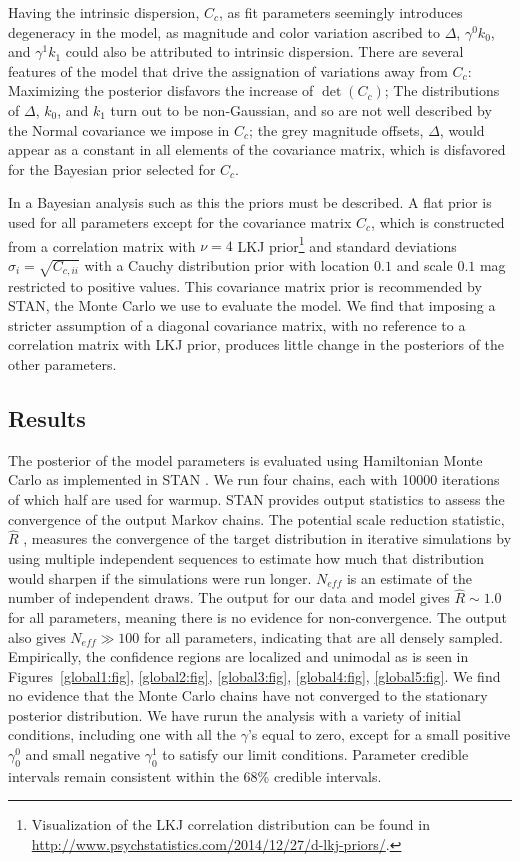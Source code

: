 \documentclass{aastex61}   	%
\begin{document}
Having the intrinsic dispersion, $C_c$, as fit parameters seemingly introduces degeneracy in the model, as magnitude and color variation
ascribed to $\Delta$, $\gamma^0 k_0$, and $\gamma^1 k_1$ could also be attributed to intrinsic dispersion.  There are several features of the model
that drive the assignation of variations away from $C_c$:  Maximizing the posterior disfavors the increase of $\det{(C_c)}$;
The distributions of $\Delta$, $k_0$, and $k_1$ turn out to
be non-Gaussian, and so are not well described by the Normal covariance we impose in $C_c$; the grey magnitude offsets, $\Delta$, would appear as a constant
in all elements of the covariance matrix, which is disfavored for the Bayesian prior selected for $C_c$.

In a Bayesian analysis such as this the priors must be described.  A flat prior is used for all parameters except
for the covariance matrix $C_c$, which is constructed from a correlation matrix with  $\nu=4$  LKJ prior\footnote{
Visualization of the LKJ correlation distribution can be found in \url{http://www.psychstatistics.com/2014/12/27/d-lkj-priors/}.}
\citep{Lewandowski20091989} and standard
deviations $\sigma_i = \sqrt{C_{c,ii}}$ with a  Cauchy distribution prior with location
 $0.1$ and scale $0.1$ mag restricted to positive values.
This covariance matrix prior is recommended by STAN, the Monte Carlo we use to evaluate the model.
 We find that imposing a stricter assumption of a
 diagonal covariance matrix, with no reference to a correlation matrix with LKJ prior, produces little change in the posteriors of
 the other parameters.

\subsection{Results}
\label{results:sec}
The posterior of the model parameters is evaluated using Hamiltonian Monte Carlo as implemented in
STAN \citep{stan}.  We run four chains, each with 10000 iterations of which
half are used for warmup.
STAN provides output statistics to assess
the convergence of the output Markov chains.
The 
potential scale reduction statistic, $\hat{R}$ \citep{Gelman92}, measures the convergence of the target distribution
in iterative simulations 
by using multiple independent sequences to estimate how much that distribution would sharpen if the simulations were run longer.
$N_{eff}$ is an estimate of the number of independent draws. The output for our data and model gives $\hat{R} \sim 1.0$ for all parameters, meaning there is no evidence for non-convergence.  The
output also gives  $N_{eff} \gg 100$ for all parameters, indicating that are all densely sampled.
Empirically, the confidence regions are localized and unimodal as is seen in  Figures~\ref{global1:fig}, \ref{global2:fig}, \ref{global3:fig}, \ref{global4:fig},
\ref{global5:fig}.  We find no evidence that
the Monte Carlo chains have not converged to the stationary posterior distribution.
We have rurun the analysis with a variety of initial conditions, including one with all the $\gamma$'s equal to zero, except for a small positive 
$\gamma^0_0$ and small negative $\gamma^1_0$ to satisfy our limit conditions.  Parameter credible intervals
remain consistent within the 68\% credible intervals.
\end{document}
